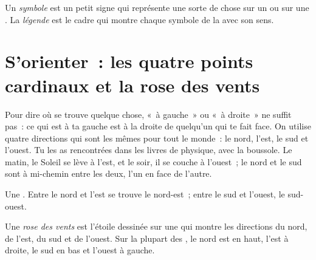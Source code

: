 \begin{definition}[Légende]\label{def:g2:drawing-to-map:legend}
Un \emph{symbole} est un petit signe qui représente une
sorte de chose sur un  ou sur une . La \emph{légende}
est le cadre qui montre chaque symbole de la  avec son sens.
\end{definition}

\section{S'orienter~: les quatre points cardinaux et la rose des vents}

Pour dire où se trouve quelque chose, «~à gauche~» ou «~à droite~» ne
suffit pas~: ce qui est à ta gauche est à la droite de quelqu'un qui te
fait face. On utilise quatre directions qui sont les mêmes pour tout le
monde~: le nord, l'est, le sud et l'ouest. Tu les as rencontrées dans les
livres de physique, avec la boussole. Le matin, le Soleil se lève à l'est,
et le soir, il se couche à l'ouest~; le nord et le sud sont à mi-chemin
entre les deux, l'un en face de l'autre.

\begin{omfigure}

{\small Une . Entre le nord et l'est se trouve le nord-est~;
entre le sud et l'ouest, le sud-ouest.}
\label{fig:g2:drawing-to-map:rose}
\end{omfigure}

\begin{definition}\label{def:g2:drawing-to-map:directions}
Une \emph{rose des vents} est l'étoile dessinée sur
une  qui montre les directions du nord, de l'est, du sud et de
l'ouest. Sur la plupart des , le nord est en haut, l'est à droite,
le sud en bas et l'ouest à gauche.
\end{definition}

